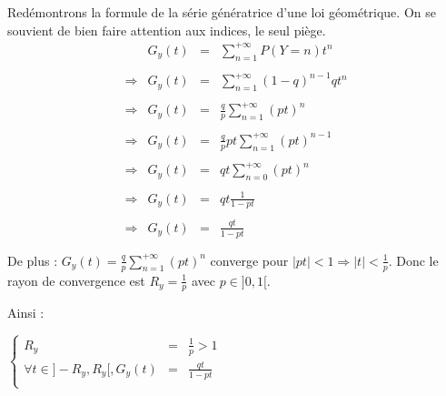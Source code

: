 Redémontrons la formule de la série génératrice d'une loi géométrique. On se souvient de bien faire attention aux indices, le seul piège.\\
\[
  \begin{array}{rrcl}
                & G_y(t) & = & \sum\limits_{n=1}^{+\infty}P(Y=n)t^n               \\\\
    \Rightarrow & G_y(t) & = & \sum\limits_{n=1}^{+\infty}(1-q)^{n-1}qt^n         \\\\
    \Rightarrow & G_y(t) & = & \frac{q}{p}\sum\limits_{n=1}^{+\infty}(pt)^{n}     \\\\
    \Rightarrow & G_y(t) & = & \frac{q}{p}pt\sum\limits_{n=1}^{+\infty}(pt)^{n-1} \\\\
    \Rightarrow & G_y(t) & = & qt\sum\limits_{n=0}^{+\infty}(pt)^{n}              \\\\
    \Rightarrow & G_y(t) & = & qt\frac{1}{1-pt}                                   \\\\
    \Rightarrow & G_y(t) & = & \frac{qt}{1-pt}                                    \\\\
  \end{array}
\]
De plus : $G_y(t) = \frac{q}{p}\sum\limits_{n=1}^{+\infty}(pt)^{n}$ converge pour $|pt|<1\Rightarrow|t|<\frac{1}{p}$. Donc le rayon de convergence est $R_y = \frac{1}{p}$ avec $p\in]0, 1[$.

Ainsi :
\begin{result}
  $
    \left\{
    \begin{array}{rcl}
      R_y                             & = & \frac{1}{p} > 1 \\
      \forall t\in]-R_y, R_y[, G_y(t) & = & \frac{qt}{1-pt} \\
    \end{array}
    \right.
  $
\end{result}
